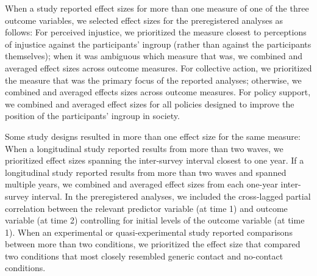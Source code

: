 \documentclass[12pt, letterpaper]{article}
\begin{document}
When a study reported effect sizes for more than one measure of one of
the three outcome variables, we selected effect sizes for the
preregistered analyses as follows: For perceived injustice, we
prioritized the measure closest to perceptions of injustice against the
participants' ingroup (rather than against the participants themselves);
when it was ambiguous which measure that was, we combined and averaged
effect sizes across outcome measures. For collective action, we
prioritized the measure that was the primary focus of the reported
analyses; otherwise, we combined and averaged effects sizes across
outcome measures. For policy support, we combined and averaged effect
sizes for all policies designed to improve the position of the
participants' ingroup in society.

Some study designs resulted in more than one effect size for the same
measure: When a longitudinal study reported results from more than two
waves, we prioritized effect sizes spanning the inter-survey interval
closest to one year. If a longitudinal study reported results from more
than two waves and spanned multiple years, we combined and averaged
effect sizes from each one-year inter-survey interval. In the
preregistered analyses, we included the cross-lagged partial correlation
between the relevant predictor variable (at time 1) and outcome variable
(at time 2) controlling for initial levels of the outcome variable (at
time 1). When an experimental or quasi-experimental study reported
comparisons between more than two conditions, we prioritized the effect
size that compared two conditions that most closely resembled generic
contact and no-contact conditions.
\end{document}
